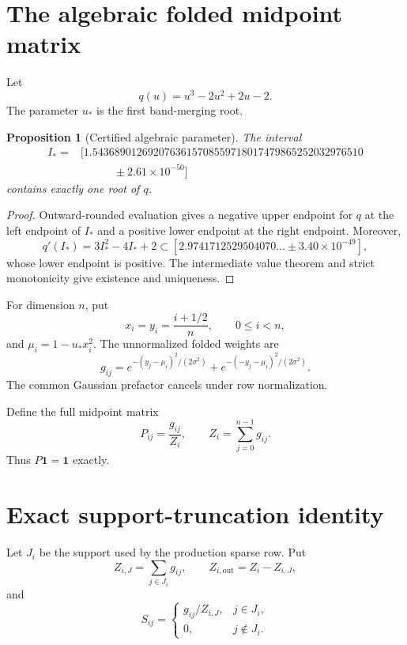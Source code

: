 \documentclass[11pt]{article}
\newtheorem{proposition}[theorem]{Proposition}
\theoremstyle{definition}
\begin{document}
\section{The algebraic folded midpoint matrix}
\label{sec:matrix}

Let
\[
 q(u)=u^3-2u^2+2u-2.
\]
The parameter $u_*$ is the first band-merging root.

\begin{proposition}[Certified algebraic parameter]
\label{prop:root}
The interval
\[
 \begin{split}
 I_*={}&[1.5436890126920763615708559718017479865252032976510\\
 &\hspace{3em}{}\pm2.61\times10^{-50}]
 \end{split}
\]
contains exactly one root of $q$.
\end{proposition}

\begin{proof}
Outward-rounded evaluation gives a negative upper endpoint for $q$ at the
left endpoint of $I_*$ and a positive lower endpoint at the right endpoint.
Moreover,
\[
 q'(I_*)=3I_*^2-4I_*+2
 \subset[2.9741712529504070\ldots\pm3.40\times10^{-49}],
\]
whose lower endpoint is positive.  The intermediate value theorem and strict
monotonicity give existence and uniqueness.
\end{proof}

For dimension $n$, put
\[
 x_i=y_i=\frac{i+1/2}{n},
 \qquad 0\le i<n,
\]
and $\mu_i=1-u_*x_i^2$.  The unnormalized folded weights are
\begin{equation}
 g_{ij}=
 e^{-(y_j-\mu_i)^2/(2\sigma^2)}
 +e^{-(-y_j-\mu_i)^2/(2\sigma^2)}.
 \label{eq:weight}
\end{equation}
The common Gaussian prefactor cancels under row normalization.

Define the full midpoint matrix
\begin{equation}
 P_{ij}=\frac{g_{ij}}{Z_i},
 \qquad
 Z_i=\sum_{j=0}^{n-1}g_{ij}.
 \label{eq:full}
\end{equation}
Thus $P\mathbf1=\mathbf1$ exactly.

\section{Exact support-truncation identity}
\label{sec:truncation}

Let $J_i$ be the support used by the production sparse row.  Put
\[
 Z_{i,J}=\sum_{j\in J_i}g_{ij},
 \qquad
 Z_{i,\mathrm{out}}=Z_i-Z_{i,J},
\]
and
\[
 S_{ij}=
 \begin{cases}
  g_{ij}/Z_{i,J},&j\in J_i,\\
  0,&j\notin J_i.
 \end{cases}
\]
\end{document}
